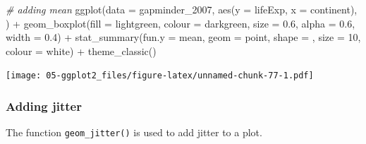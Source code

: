 \documentclass[
]{book}
\newenvironment{Shaded}{\begin{snugshade}}{\end{snugshade}}
\newcommand{\AttributeTok}[1]{\textcolor[rgb]{0.77,0.63,0.00}{#1}}
\newcommand{\CommentTok}[1]{\textcolor[rgb]{0.56,0.35,0.01}{\textit{#1}}}
\newcommand{\DecValTok}[1]{\textcolor[rgb]{0.00,0.00,0.81}{#1}}
\newcommand{\FloatTok}[1]{\textcolor[rgb]{0.00,0.00,0.81}{#1}}
\newcommand{\FunctionTok}[1]{\textcolor[rgb]{0.00,0.00,0.00}{#1}}
\newcommand{\NormalTok}[1]{#1}
\newcommand{\SpecialCharTok}[1]{\textcolor[rgb]{0.00,0.00,0.00}{#1}}
\newcommand{\StringTok}[1]{\textcolor[rgb]{0.31,0.60,0.02}{#1}}
\begin{document}
\begin{Shaded}
\begin{Highlighting}[]
\CommentTok{\# adding mean}
\FunctionTok{ggplot}\NormalTok{(}\AttributeTok{data =}\NormalTok{ gapminder\_2007, }\FunctionTok{aes}\NormalTok{(}\AttributeTok{y =}\NormalTok{ lifeExp, }\AttributeTok{x =}\NormalTok{ continent), ) }\SpecialCharTok{+} 
   \FunctionTok{geom\_boxplot}\NormalTok{(}\AttributeTok{fill =} \StringTok{\textquotesingle{}lightgreen\textquotesingle{}}\NormalTok{, }
                \AttributeTok{colour =} \StringTok{\textquotesingle{}darkgreen\textquotesingle{}}\NormalTok{, }
                \AttributeTok{size =} \FloatTok{0.6}\NormalTok{, }
                \AttributeTok{alpha =} \FloatTok{0.6}\NormalTok{, }
                \AttributeTok{width =} \FloatTok{0.4}\NormalTok{) }\SpecialCharTok{+}
   \FunctionTok{stat\_summary}\NormalTok{(}\AttributeTok{fun.y =}\NormalTok{ mean, }\AttributeTok{geom =} \StringTok{\textquotesingle{}point\textquotesingle{}}\NormalTok{, }\AttributeTok{shape =} \StringTok{\textquotesingle{}{-}\textquotesingle{}}\NormalTok{, }\AttributeTok{size =} \DecValTok{10}\NormalTok{, }\AttributeTok{colour =} \StringTok{\textquotesingle{}white\textquotesingle{}}\NormalTok{) }\SpecialCharTok{+}
   \FunctionTok{theme\_classic}\NormalTok{()}
\end{Highlighting}
\end{Shaded}

\texttt{[image: 05-ggplot2\_files/figure-latex/unnamed-chunk-77-1.pdf]}

\hypertarget{adding-jitter}{%
\subsubsection{Adding jitter}\label{adding-jitter}}

The function \texttt{geom\_jitter()} is used to add jitter to a plot.
\end{document}
